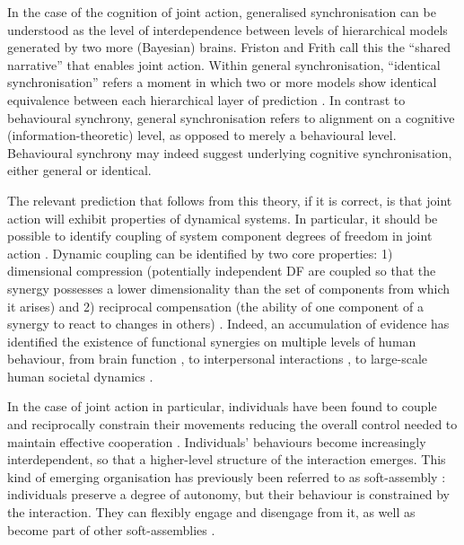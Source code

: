 \begin{CJK}{UTF8}{gbsn}
In the case of the cognition of joint action, generalised synchronisation can be understood as the level of interdependence between levels of hierarchical models generated by two more (Bayesian) brains.  Friston and Frith call this the ``shared narrative'' that enables joint action.  Within general synchronisation, ``identical synchronisation'' refers a moment in which two or more models show identical equivalence between each hierarchical layer of prediction \citep{Friston2015}.   In contrast to behavioural synchrony, general synchronisation refers to alignment on a cognitive (information-theoretic) level, as opposed to merely a behavioural level. Behavioural synchrony may indeed suggest underlying cognitive synchronisation, either general or identical.

The relevant prediction that follows from this theory, if it is correct, is that joint action will exhibit properties of dynamical systems.  In particular, it should be possible to identify coupling of system component degrees of freedom in joint action \citep{Turvey1978,Schmidt1990}.  Dynamic coupling can be identified by two core properties:  1) dimensional compression (potentially independent DF are coupled so that the synergy possesses a lower dimensionality than the set of components from which it arises) and 2) reciprocal compensation (the ability of one component of a synergy to react to changes in others) \citep{Riley2011}.  Indeed, an accumulation of evidence has identified the existence of functional synergies on multiple levels of human behaviour, from brain function \citep{Yufik1998,Sengupta2013}, to interpersonal interactions \citep{Kelso2009,Riley2011,Fusaroli2014}, to large-scale human societal dynamics \citep{Nowak2017}.

In the case of joint action in particular, individuals have been found to couple and reciprocally constrain their movements reducing the overall control needed to maintain effective cooperation \citep{Ramenzoni2011,Ramenzoni2012,Riley2011,Schmidt1990}.  Individuals’ behaviours become increasingly interdependent, so that a higher-level structure of the interaction emerges. This kind of emerging organisation has previously been referred to as soft-assembly \citep{Kello2009}: individuals preserve a degree of autonomy, but their behaviour is constrained by the interaction. They can flexibly engage and disengage from it, as well as become part of other soft-assemblies \citep{DeJaegher2010,DiPaolo2012}.


\end{CJK}
